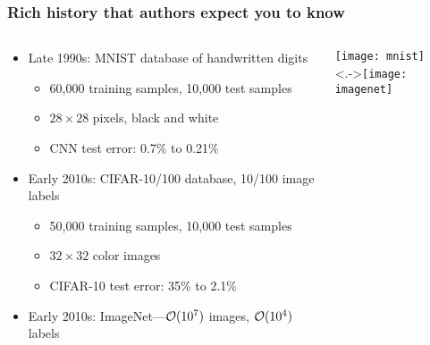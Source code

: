 \begin{frame}
    \frametitle{Rich history that authors expect you to know}
    \begin{columns}
        \begin{column}{0.55\textwidth}
            \begin{itemize}
                \item<+-> Late 1990s: MNIST database of handwritten digits
                \begin{itemize}
                    \item 60,000 training samples, 10,000 test samples
                    \item $28 \times 28$ pixels, black and white
                    \item CNN test error: 0.7\% \citep[``LeNet-5'',][]{LeCunIEEE98} to 0.21\% \citep{WanICML13}
                \end{itemize}
                \item<+-> Early 2010s: CIFAR-10/100 database, 10/100 image labels
                \begin{itemize}
                    \item 50,000 training samples, 10,000 test samples
                    \item $32 \times 32$ color images
                    \item CIFAR-10 test error: 35\% \citep{RanzatoAISTATS10} to 2.1\% \citep{Real18}
                \end{itemize}
                \item<+-> Early 2010s: ImageNet---$\mathcal{O}(10^7)$ images, $\mathcal{O}(10^4)$ labels
            \end{itemize}
        \end{column}
        \begin{column}{0.45\textwidth}
            \texttt{[image: mnist]} \\[5mm]
            \uncover<.->{\texttt{[image: imagenet]}}
        \end{column}
    \end{columns}
\end{frame}

